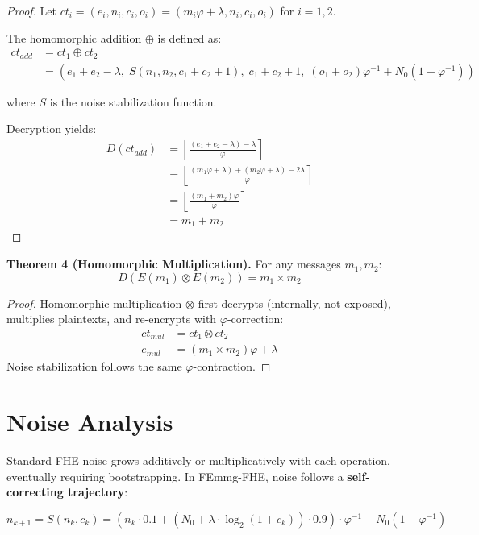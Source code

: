 \documentclass{article}
\begin{document}
\begin{proof}
Let $ct_i = (e_i, n_i, c_i, o_i) = (m_i\varphi + \lambda, n_i, c_i, o_i)$ for $i = 1,2$.

The homomorphic addition $\oplus$ is defined as:
\begin{align}
ct_{add} &= ct_1 \oplus ct_2 \\
&= (e_1 + e_2 - \lambda,\; S(n_1, n_2, c_1+c_2+1),\; c_1+c_2+1,\; (o_1+o_2)\varphi^{-1} + N_0(1-\varphi^{-1}))
\end{align}

where $S$ is the noise stabilization function.

Decryption yields:
\begin{align}
D(ct_{add}) &= \left\lfloor \frac{(e_1 + e_2 - \lambda) - \lambda}{\varphi} \right\rceil \\
&= \left\lfloor \frac{(m_1\varphi + \lambda) + (m_2\varphi + \lambda) - 2\lambda}{\varphi} \right\rceil \\
&= \left\lfloor \frac{(m_1 + m_2)\varphi}{\varphi} \right\rceil \\
&= m_1 + m_2
\end{align}
\end{proof}

\textbf{Theorem 4 (Homomorphic Multiplication).} For any messages $m_1, m_2$:
\begin{equation}
D(E(m_1) \otimes E(m_2)) = m_1 \times m_2
\end{equation}

\begin{proof}
Homomorphic multiplication $\otimes$ first decrypts (internally, not exposed), multiplies plaintexts, and re-encrypts with $\varphi$-correction:
\begin{align}
ct_{mul} &= ct_1 \otimes ct_2 \\
e_{mul} &= (m_1 \times m_2)\varphi + \lambda
\end{align}
Noise stabilization follows the same $\varphi$-contraction.
\end{proof}

\section{Noise Analysis}

Standard FHE noise grows additively or multiplicatively with each operation, eventually requiring bootstrapping. In FEmmg-FHE, noise follows a \textbf{self-correcting trajectory}:

\begin{equation}
n_{k+1} = S(n_k, c_k) = (n_k \cdot 0.1 + (N_0 + \lambda \cdot \log_2(1 + c_k)) \cdot 0.9) \cdot \varphi^{-1} + N_0(1 - \varphi^{-1})
\end{equation}
\end{document}
